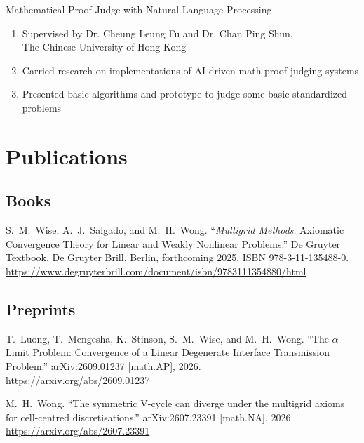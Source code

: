 \documentclass[11pt,letterpaper]{report}
\begin{document}
\begin{tablist}
\begin{enumerate}
        \end{enumerate}
        \vspace{1cm}

        \item[2019] Mathematical Proof Judge with Natural Language Processing
        \begin{enumerate}
            \item Supervised by Dr. Cheung Leung Fu and Dr. Chan Ping Shun,\\
            The Chinese University of Hong Kong
            \item Carried research on implementations of AI-driven math proof judging systems
            \item Presented basic algorithms and prototype to judge some basic standardized problems

        \end{enumerate}

    \end{tablist}



    \section*{Publications}

\subsection*{Books}

\begin{tablist}
    \item[2025] \tab{}S.\ M.\ Wise, A.\ J.\ Salgado, and M.\ H.\ Wong.
    \enquote{\textit{Multigrid Methods}: Axiomatic Convergence Theory for Linear and Weakly Nonlinear Problems.}
    De Gruyter Textbook, De Gruyter Brill, Berlin, forthcoming 2025.
    ISBN 978-3-11-135488-0.\\
    \url{https://www.degruyterbrill.com/document/isbn/9783111354880/html}
\end{tablist}

\subsection*{Preprints}

\begin{tablist}
    \item[2026] \tab{}T.\ Luong, T.\ Mengesha, K.\ Stinson, S.\ M.\ Wise, and M.\ H.\ Wong.
    \enquote{The $\alpha$-Limit Problem: Convergence of a Linear Degenerate Interface Transmission Problem.}
    arXiv:2609.01237 [math.AP], 2026.\\
    \url{https://arxiv.org/abs/2609.01237}

    \item[2026] \tab{}M.\ H.\ Wong.
    \enquote{The symmetric V-cycle can diverge under the multigrid axioms for cell-centred discretisations.}
    arXiv:2607.23391 [math.NA], 2026.\\
    \url{https://arxiv.org/abs/2607.23391}
\end{tablist}
\end{document}
